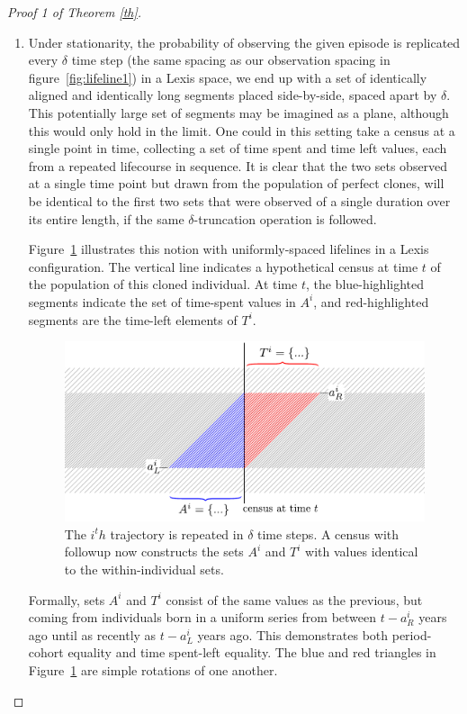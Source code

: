 \documentclass[12pt,oneside,a4paper]{article}
\theoremstyle{definition}
\begin{document}
\begin{proof}[Proof 1 of Theorem \ref{th}]
\begin{enumerate}
\FloatBarrier
\item{} Under stationarity, the probability of observing the given episode is replicated every $\delta$ time step (the
same spacing as our observation spacing in figure~\ref{fig:lifeline1}) in a
Lexis space, we end up with a set of identically aligned and identically long segments placed side-by-side, spaced apart by $\delta$.
This potentially large set of segments may be imagined as a plane, although this
would only hold in the limit.
One could in this setting take a census at a single point in time, collecting a set of
time spent and time left values, each from a repeated lifecourse in
sequence.
It is clear that the two sets observed at a single time point but drawn from the population of
perfect clones, will be identical to the first two sets that were observed of
a single duration over its entire length, if the same $\delta$-truncation operation is followed.

Figure~\ref{fig:clones} illustrates this notion with uniformly-spaced lifelines
in a Lexis configuration. The vertical line indicates a hypothetical census at time $t$ of
the population of this cloned individual. At time $t$, the blue-highlighted segments indicate
the set of time-spent values in $A^i$, and red-highlighted segments are the
time-left elements of $T^i$. 

 \begin{figure}[h!]
\centering
\caption{The $i^th$ trajectory is repeated in $\delta$ time steps. A
census with followup now constructs the sets $A^i$ and $T^i$ with values
identical to the within-individual sets.}
\label{fig:clones}
\includegraphics[scale=.8]{Figures/lifelinerepeated.pdf}
\end{figure}

Formally, sets $A^i$ and $T^i$ consist of the same values as the previous, but
coming from individuals born in a uniform series from between $t-a_R^i$ years
ago until as recently as $t-a_L^i$ years ago. This demonstrates both
period-cohort equality and time spent-left equality. The blue and red triangles in
Figure~\ref{fig:clones} are simple rotations of one another.


\end{enumerate}
\end{proof}
\end{document}
